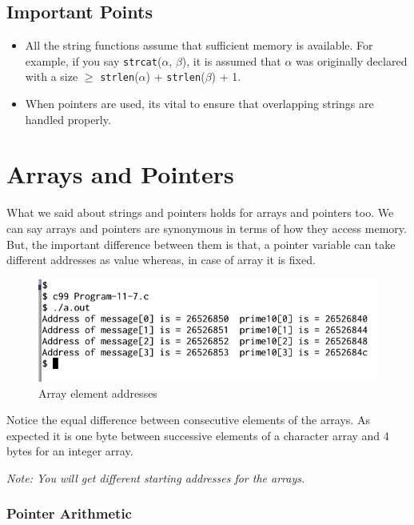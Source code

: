 \documentclass[11pt,a4paper]{article}
\begin{document}
\subsection*{Important Points}
\begin{itemize}
\item All the string functions assume that sufficient memory is available. For example, if you say \texttt{strcat}($\alpha$, $\beta$), it is assumed that $\alpha$ was originally declared with a size $\geq$ \texttt{strlen}($\alpha$) + \texttt{strlen}($\beta$) + 1.
\item When pointers are used, its vital to ensure that overlapping strings are handled properly.
\end{itemize}
  
\section*{Arrays and Pointers}
What we said about strings and pointers holds for arrays and pointers too. We can say arrays and pointers are synonymous in terms of how they access memory. But, the important difference between them is that, a pointer variable can take different addresses as value whereas, in case of array it is fixed.



\begin{figure}[ht]
\begin{center}
\includegraphics[scale=0.6]{Output-11-7.png}
\caption{Array element addresses}
\label{output-11-7}
\end{center}
\end{figure}

Notice the equal difference between consecutive elements of the arrays. As expected it is one byte between successive elements of a character array and 4 bytes for an integer array.

\emph{Note: You will get different starting addresses for the arrays.}

\subsubsection*{Pointer Arithmetic} 
\end{document}
